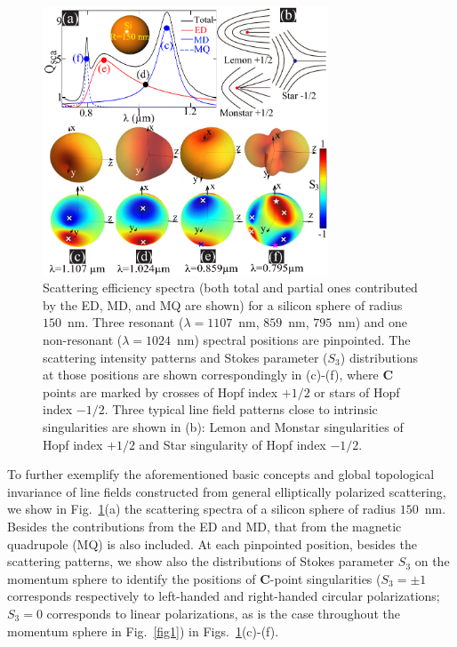 \documentclass[aps,twocolumn,superscriptaddress]{revtex4-1}
\newcounter{Fig}
\begin{document}
%
\begin{figure}[tp]
\centerline{\includegraphics[width=8.5cm]{figure2}} \caption{\small Scattering efficiency spectra (both total and  partial ones contributed by the ED, MD, and MQ are shown) for a silicon sphere of radius $150$~nm. Three resonant ($\lambda=1107$~nm, $859$~nm, $795$~nm) and one non-resonant ($\lambda=1024$~nm) spectral positions are pinpointed. The scattering intensity patterns and Stokes parameter ($S_3$) distributions at those positions are shown correspondingly in (c)-(f), where \textbf{C} points are marked by crosses of Hopf index $+1/2$ or stars of Hopf index $-1/2$.  Three typical line field patterns close to intrinsic singularities are shown in (b): Lemon and Monstar singularities of Hopf index $+1/2$ and Star singularity of Hopf index $-1/2$.}
\label{fig2}
\end{figure}
%


To further exemplify the aforementioned basic concepts and global topological invariance of line fields constructed from general elliptically polarized scattering, we show in Fig.~\ref{fig2}(a) the scattering spectra of a silicon sphere of radius $150$~nm. Besides the contributions from the ED and MD, that from the magnetic quadrupole (MQ) is also included. At each pinpointed position, besides the scattering patterns, we show also the distributions of Stokes parameter $S_3$ on the momentum sphere to identify the positions of \textbf{C}-point singularities ($S_3=\pm 1$ corresponds respectively to left-handed and right-handed circular polarizations; $S_3=0$ corresponds to linear polarizations, as is the case throughout the momentum sphere in Fig.~\ref{fig1}) in Figs.~\ref{fig2}(c)-(f).
\end{document}

